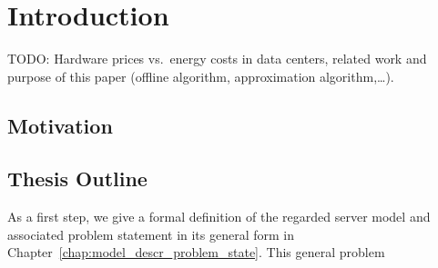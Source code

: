 
\chapter{Introduction}
TODO: Hardware prices vs.\ energy costs in data centers, related work and purpose of this paper (offline algorithm, approximation algorithm,\ldots).
\section{Motivation}

\section{Thesis Outline}
As a first step, we give a formal definition of the regarded server model and associated problem statement in its general form in Chapter~\ref{chap:model_descr_problem_state}. This general problem 

